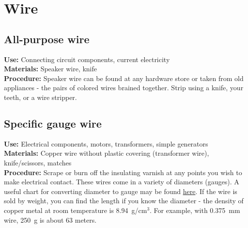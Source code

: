\section{Wire}
\label{sec:wire}
\subsection{All-purpose wire}
\vspace{-6pt}
\textbf{Use:} Connecting circuit components, current electricity\\
\textbf{Materials:} Speaker wire, knife\\
\textbf{Procedure:} Speaker wire can be found at any hardware store or taken from old appliances - the pairs of colored wires brained together. Strip using a knife, your teeth, or a wire stripper.

\subsection{Specific gauge wire}
\vspace{-6pt}
\textbf{Use:} Electrical components, motors, transformers, simple generators\\
\textbf{Materials:} Copper wire without plastic covering (transformer wire), knife\slash scissors, matches\\
\textbf{Procedure:} Scrape or burn off the insulating varnish at any points you wish to make electrical contact. 
These wires come in a variety of diameters (gauges). A useful chart for converting diameter to gauge may be found \href{http://www.dave-cushman.net/elect/wiregauge.html}{here}. If the wire is sold by weight, 
you can find the length if you know the diameter - the density of copper metal at room temperature is 8.94~g/cm$^{3}$. For example, with 0.375~mm wire, 250~g is about 63 meters.

